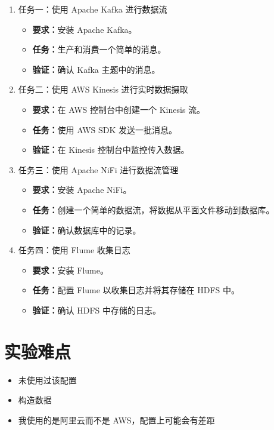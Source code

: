 \documentclass{article}
\begin{document}
\begin{enumerate}
    \item 任务一：使用 Apache Kafka 进行数据流
    \begin{itemize}
        \item \textbf{要求：}安装 Apache Kafka。
        \item \textbf{任务：}生产和消费一个简单的消息。
        \item \textbf{验证：}确认 Kafka 主题中的消息。
    \end{itemize}
    
    \item 任务二：使用 AWS Kinesis 进行实时数据摄取
    \begin{itemize}
        \item \textbf{要求：}在 AWS 控制台中创建一个 Kinesis 流。
        \item \textbf{任务：}使用 AWS SDK 发送一批消息。
        \item \textbf{验证：}在 Kinesis 控制台中监控传入数据。
    \end{itemize}
    
    \item 任务三：使用 Apache NiFi 进行数据流管理
    \begin{itemize}
        \item \textbf{要求：}安装 Apache NiFi。
        \item \textbf{任务：}创建一个简单的数据流，将数据从平面文件移动到数据库。
        \item \textbf{验证：}确认数据库中的记录。
    \end{itemize}
    
    \item 任务四：使用 Flume 收集日志
    \begin{itemize}
        \item \textbf{要求：}安装 Flume。
        \item \textbf{任务：}配置 Flume 以收集日志并将其存储在 HDFS 中。
        \item \textbf{验证：}确认 HDFS 中存储的日志。
    \end{itemize}
\end{enumerate}

\section*{实验难点}

\begin{itemize}
    \item 未使用过该配置
    \item 构造数据
    \item 我使用的是阿里云而不是 AWS，配置上可能会有差距
\end{itemize}
\end{document}
